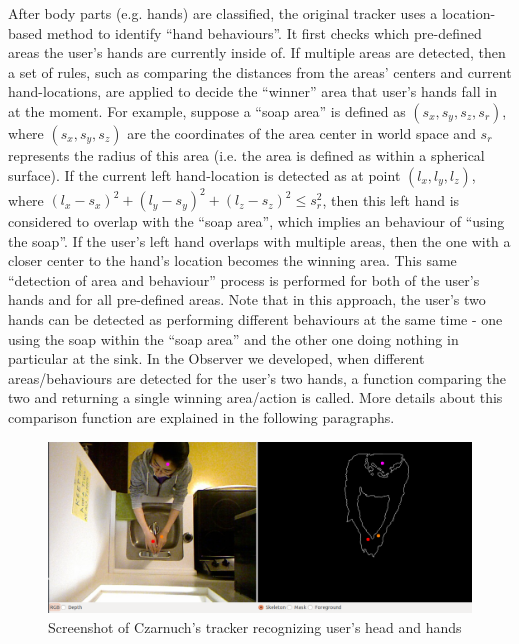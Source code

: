 After body parts (e.g. hands) are classified, the original tracker uses a location-based method to identify ``hand behaviours''. It first checks which pre-defined areas the user's hands are currently inside of. If multiple areas are detected, then a set of rules, such as comparing the distances from the areas' centers and current hand-locations, are applied to decide the ``winner'' area that user's hands fall in at the moment. For example, suppose a ``soap area'' is defined as $(s_{x}, s_{y}, s_{z}, s_{r})$, where $(s_{x}, s_{y}, s_{z})$ are the coordinates of the area center in world space and $s_{r}$ represents the radius of this area (i.e. the area is defined as within a spherical surface). If the current left hand-location is detected as at point $(l_{x}, l_{y}, l_{z})$, where $(l_{x}-s_{x})^{2} + (l_{y}-s_{y})^{2} + (l_{z}-s_{z})^{2} \leqslant s_{r}^{2}$, then this left hand is considered to overlap with the ``soap area'', which implies an behaviour of ``using the soap''. If the user's left hand overlaps with multiple areas, then the one with a closer center to the hand's location becomes the winning area. This same ``detection of area and behaviour'' process is performed for both of the user's hands and for all pre-defined areas. Note that in this approach, the user's two hands can be detected as performing different behaviours at the same time - one using the soap within the ``soap area'' and the other one doing nothing in particular at the sink. In the Observer we developed, when different areas/behaviours are detected for the user's two hands, a function comparing the two and returning a single winning area/action is called. More details about this comparison function are explained in the following paragraphs.

%
\begin{figure}[p]
\centering
\includegraphics[width=0.9\linewidth]{fig/handtracker-performance.png}
\caption{Screenshot of Czarnuch's tracker recognizing user's head and hands}
\label{fig:handtracker-performance}
\end{figure}

